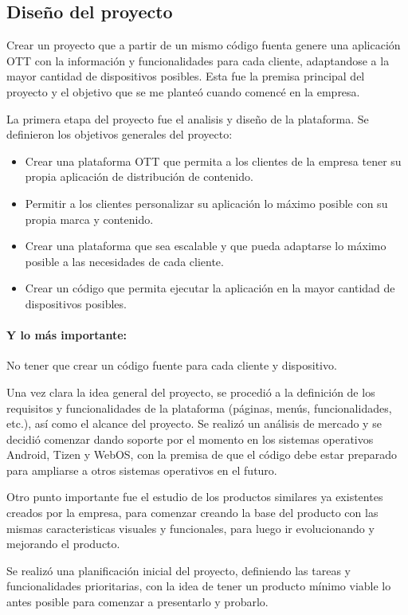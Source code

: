 \subsection{Diseño del proyecto}
\label{sec:metodologia_diseno}

Crear un proyecto que a partir de un mismo código fuenta genere una aplicación OTT con la información y funcionalidades
para cada cliente, adaptandose a la mayor cantidad de dispositivos posibles. Esta fue la premisa principal del proyecto
y el objetivo que se me planteó cuando comencé en la empresa. 

La primera etapa del proyecto fue el analisis y diseño de la plataforma. Se definieron los objetivos generales del proyecto:

\begin{itemize}
    \item Crear una plataforma OTT que permita a los clientes de la empresa tener su propia aplicación de distribución de contenido.
    \item Permitir a los clientes personalizar su aplicación lo máximo posible con su propia marca y contenido.
    \item Crear una plataforma que sea escalable y que pueda adaptarse lo máximo posible a las necesidades de cada cliente.
    \item Crear un código que permita ejecutar la aplicación en la mayor cantidad de dispositivos posibles.
\end{itemize}

\paragraph{Y lo más importante:} No tener que crear un código fuente para cada cliente y dispositivo. 

Una vez clara la idea general del proyecto, se procedió a la definición de los requisitos y funcionalidades de la plataforma
(páginas, menús, funcionalidades, etc.), así como el alcance del proyecto. Se realizó un análisis de mercado y 
se decidió comenzar dando soporte por el momento en los sistemas operativos Android, Tizen y WebOS, con la premisa 
de que el código debe estar preparado para ampliarse a otros sistemas operativos en el futuro.

Otro punto importante fue el estudio de los productos similares ya existentes creados por la empresa, para comenzar 
creando la base del producto con las mismas caracteristicas visuales y funcionales, para luego ir evolucionando y 
mejorando el producto.

Se realizó una planificación inicial del proyecto, definiendo las tareas y funcionalidades prioritarias, con la idea de 
tener un producto mínimo viable lo antes posible para comenzar a presentarlo y probarlo. 


